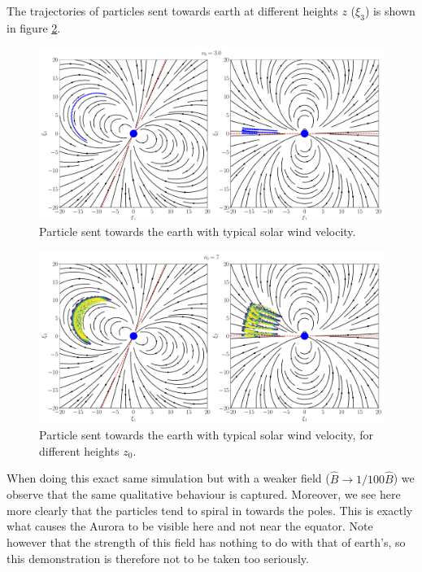 The trajectories of particles sent towards earth at different heights $z$ ($\xi_3$) is shown in figure \ref{fig:different_z}.

\begin{figure}[htb]
	\centering
	\includegraphics[width=\columnwidth]{../fig/earth_traj_slow.pdf}
	\caption{Particle sent towards the earth with typical solar wind velocity.}
	\label{fig:slow_part}
\end{figure}
\begin{figure}[h!]
	\centering
	\includegraphics[width=\columnwidth]{../fig/traj_diffz.pdf}
	\caption{Particle sent towards the earth with typical solar wind velocity, for different heights $z_0$.}
	\label{fig:different_z}
\end{figure}

When doing this exact same simulation but with a weaker field ($\hat{B} \to 1/100 \hat{B}$) we observe that the same qualitative behaviour is captured. Moreover, we see here more clearly that the particles tend to spiral in towards the poles. This is exactly what causes the Aurora to be visible here and not near the equator. Note however that the strength of this field has nothing to do with that of earth's, so this demonstration is therefore not to be taken too seriously.

